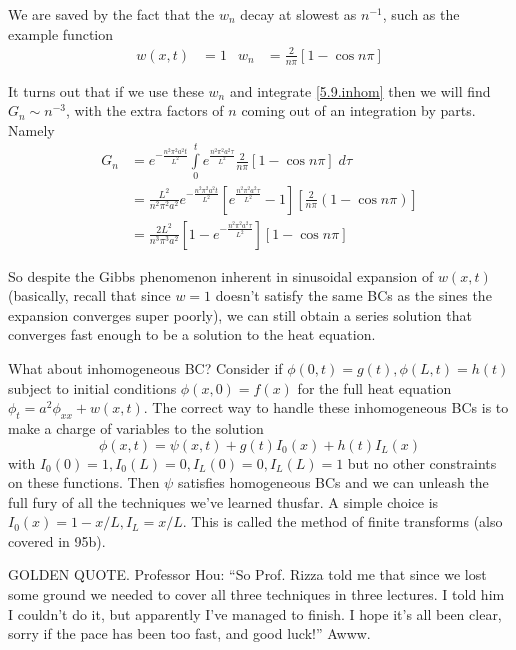 \documentclass[10pt]{report}
\begin{document}
We are saved by the fact that the $w_n$ decay at slowest as $n^{-1}$, such as the example function
\begin{align}
    w(x,t) &= 1 & w_n &= \frac{2}{n\pi}\left[ 1 - \cos n\pi \right]
\end{align}

It turns out that if we use these $w_n$ and integrate \eqref{5.9.inhom} then we will find $G_n \sim n^{-3}$, with the extra factors of $n$ coming out of an integration by parts. Namely
\begin{align}
    G_n &= e^{-\frac{n^2 \pi^2 a^2 t}{L^2}}\int\limits_{0}^{t}e^{\frac{n^2 \pi^2 a^2 \tau}{L^2}}\frac{2}{n\pi}\left[ 1 - \cos n\pi \right]\;d\tau\\
    &= \frac{L^2}{n^2 \pi^2 a^2}e^{-\frac{n^2 \pi^2 a^2 t}{L^2}} \left[ e^{\frac{n^2 \pi^2 a^2 \tau}{L^2}} - 1 \right] \left[ \frac{2}{n\pi}\left( 1 - \cos n\pi \right) \right]\\
    &= \frac{2L^2}{n^3 \pi^3 a^2} \left[ 1 - e^{-\frac{n^2 \pi^2 a^2 \tau}{L^2}} \right] \left[ 1 - \cos n\pi \right]
\end{align}

So despite the Gibbs phenomenon inherent in sinusoidal expansion of $w(x,t)$ (basically, recall that since $w=1$ doesn't satisfy the same BCs as the sines the expansion converges super poorly), we can still obtain a series solution that converges fast enough to be a solution to the heat equation.

What about inhomogeneous BC? Consider if $\phi(0,t) = g(t), \phi(L,t) = h(t)$ subject to initial conditions $\phi(x,0) = f(x)$ for the full heat equation $\phi_t = a^2 \phi_{xx} + w(x,t)$. The correct way to handle these inhomogeneous BCs is to make a charge of variables to the solution
\begin{equation}
    \phi(x,t) = \psi(x,t) + g(t) I_0(x) + h(t)I_L(x)
\end{equation}
with $I_0(0) = 1, I_0(L) = 0, I_L(0) = 0, I_L(L) = 1$ but no other constraints on these functions. Then $\psi$ satisfies homogeneous BCs and we can unleash the full fury of all the techniques we've learned thusfar. A simple choice is $I_0(x) = 1 - x/L, I_L = x/L$. This is called the method of finite transforms (also covered in 95b).

GOLDEN QUOTE. Professor Hou: ``So Prof. Rizza told me that since we lost some ground we needed to cover all three techniques in three lectures. I told him I couldn't do it, but apparently I've managed to finish. I hope it's all been clear, sorry if the pace has been too fast, and good luck!'' Awww. 
\end{document}
